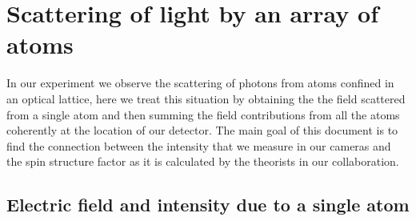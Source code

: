 \documentclass[11pt,letter]{article}
\begin{document}
\section{Scattering of light by an array of atoms}

In our experiment we observe the scattering of photons from atoms confined in
an optical lattice, here we treat this situation by obtaining the the field
scattered from a single atom and then summing the field contributions from all
the atoms coherently at the location of our detector.  The main goal of this
document is to find the connection between the intensity that we measure in our
cameras and the spin structure factor as it is calculated by the theorists in
our collaboration.  

\subsection{Electric field and intensity due to a single atom}
\end{document}
